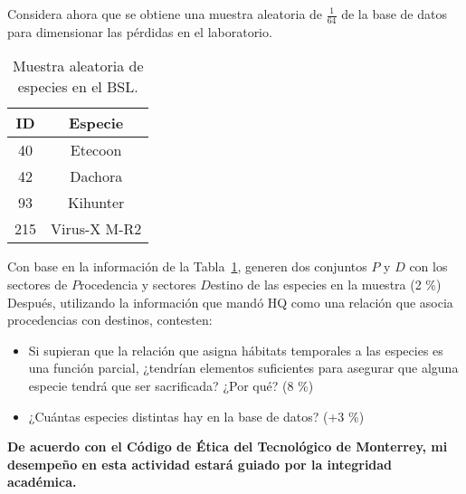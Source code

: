 \documentclass[8pt, onside]{article}
\begin{document}
Considera ahora que se obtiene una muestra aleatoria de $\frac{1}{64}$ de la base de datos para dimensionar las pérdidas en el laboratorio.

\begin{table}[htbp]
    \label{tab:my-table}
    \caption{Muestra aleatoria de especies en el BSL.}
    \centering
    \begin{tabular}{@{}cc@{}}
    \toprule
    ID  & Especie      \\ \midrule
    40  & Etecoon      \\
    42  & Dachora      \\
    93  & Kihunter     \\
    215 & Virus-X M-R2 \\ \bottomrule
    \end{tabular}
\end{table}

Con base en la información de la Tabla~\ref{tab:my-table}, generen dos conjuntos $P$ y $D$ con los sectores de $P$rocedencia y sectores $D$estino de las especies en la muestra (2 \%)
Después, utilizando la información que mandó HQ como una relación que asocia procedencias con destinos, contesten:

\begin{itemize}
    \item Si supieran que la relación que asigna hábitats temporales a las especies es una función parcial, ¿tendrían elementos suficientes para asegurar que alguna especie tendrá que ser sacrificada? ¿Por qué? (8 \%)
    \item ¿Cuántas especies distintas hay en la base de datos? (+3 \%)
\end{itemize}

\vfill

\textbf{De acuerdo con el Código de Ética del Tecnológico de Monterrey, mi desempeño en esta actividad estará guiado por la integridad académica.}
\end{document}
